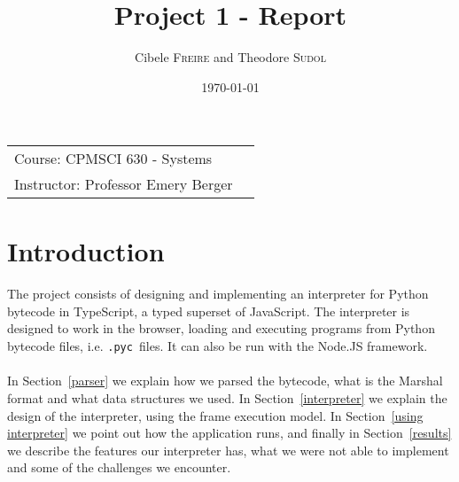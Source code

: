\documentclass{article}
\title{Project 1 - Report} %
\author{Cibele \textsc{Freire} and Theodore \textsc{Sudol}} %
\date{\today} %
\newcommand{\pyc}{\texttt{.pyc~}}
\begin{document}

\maketitle %

\begin{center}
\begin{tabular}{l r}
Course: CPMSCI 630 - Systems \\
Instructor: Professor Emery Berger %
\end{tabular}
\end{center}





\section{Introduction}\label{intro}

\paragraph{}
The project consists of designing and implementing an interpreter for Python bytecode in TypeScript, a typed superset of JavaScript. The interpreter is designed to work in the browser, loading and executing programs from Python bytecode files, i.e. \pyc files. It can also be run with the Node.JS framework.

\paragraph{}
In Section~\ref{parser} we explain how we parsed the bytecode, what is the Marshal format and what data structures we used. In Section~\ref{interpreter} we explain the design of the interpreter, using the frame execution model. In Section~\ref{using interpreter} we point out how the application runs, and finally in Section~\ref{results} we describe the features our interpreter has, what we were not able to implement and some of the challenges we encounter.
\end{document}
